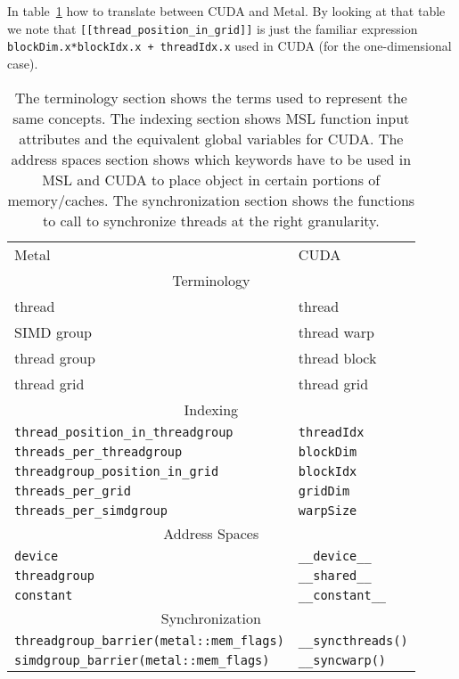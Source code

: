 \documentclass{sapthesis}
\begin{document}
In table~\ref{tab:metal2cuda} how to translate between CUDA and Metal. By
looking at that table we note that \verb+[[thread_position_in_grid]]+ is just
the familiar expression \verb|blockDim.x*blockIdx.x + threadIdx.x| used in CUDA
(for the one-dimensional case).

\begin{table}
\centering
\begin{tabular}{ll}
    Metal & CUDA \\
    \multicolumn{2}{c}{Terminology} \\
    thread       & thread \\
    SIMD group   & thread warp \\
    thread group & thread block \\
    thread grid  & thread grid \\
    \multicolumn{2}{c}{Indexing} \\
    \verb+thread_position_in_threadgroup+ & \texttt{threadIdx} \\
    \verb+threads_per_threadgroup+        & \texttt{blockDim} \\
    \verb+threadgroup_position_in_grid+   & \texttt{blockIdx} \\
    \verb+threads_per_grid+               & \texttt{gridDim} \\
    \verb+threads_per_simdgroup+          & \texttt{warpSize} \\
    \multicolumn{2}{c}{Address Spaces} \\
    \texttt{device}      & \verb+__device__+ \\
    \texttt{threadgroup} & \verb+__shared__+ \\
    \texttt{constant}    & \verb+__constant__+ \\
    \multicolumn{2}{c}{Synchronization} \\
    \verb+threadgroup_barrier(metal::mem_flags)+ & \verb+__syncthreads()+ \\
    \verb+simdgroup_barrier(metal::mem_flags)+   & \verb+__syncwarp()+
\end{tabular}
\caption{The terminology section shows the terms used to represent the same
concepts. The indexing section shows MSL function input attributes and the
equivalent global variables for CUDA. The address spaces section shows which
keywords have to be used in MSL and CUDA to place object in certain portions of
memory/caches. The synchronization section shows the functions to call to
synchronize threads at the right granularity.}
\label{tab:metal2cuda}
\end{table}
\end{document}
